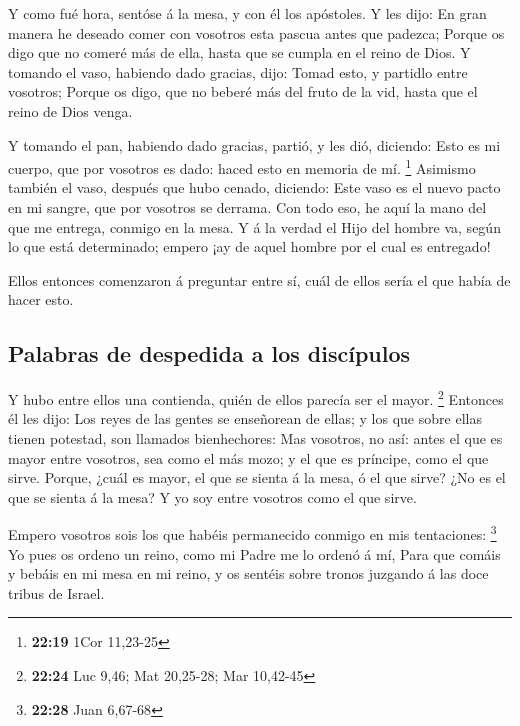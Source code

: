  Y como fué hora, sentóse á la mesa, y con él los
apóstoles.  Y les dijo: En gran manera he deseado comer
con vosotros esta pascua antes que padezca;  Porque os
digo que no comeré más de ella, hasta que se cumpla en el reino de Dios.
 Y tomando el vaso, habiendo dado gracias, dijo: Tomad
esto, y partidlo entre vosotros;  Porque os digo, que no
beberé más del fruto de la vid, hasta que el reino de Dios venga.

 Y tomando el pan, habiendo dado gracias, partió, y les
dió, diciendo: Esto es mi cuerpo, que por vosotros es dado: haced esto
en memoria de mí. \footnote{\textbf{22:19} 1Cor 11,23-25}
 Asimismo también el vaso, después que hubo cenado,
diciendo: Este vaso es el nuevo pacto en mi sangre, que por vosotros se
derrama.  Con todo eso, he aquí la mano del que me
entrega, conmigo en la mesa.  Y á la verdad el Hijo del
hombre va, según lo que está determinado; empero ¡ay de aquel hombre por
el cual es entregado!

 Ellos entonces comenzaron á preguntar entre sí, cuál de
ellos sería el que había de hacer esto.

\hypertarget{palabras-de-despedida-a-los-discuxedpulos}{%
\subsection{Palabras de despedida a los
discípulos}\label{palabras-de-despedida-a-los-discuxedpulos}}

 Y hubo entre ellos una contienda, quién de ellos parecía
ser el mayor. \footnote{\textbf{22:24} Luc 9,46; Mat 20,25-28; Mar
  10,42-45}  Entonces él les dijo: Los reyes de las
gentes se enseñorean de ellas; y los que sobre ellas tienen potestad,
son llamados bienhechores:  Mas vosotros, no así: antes
el que es mayor entre vosotros, sea como el más mozo; y el que es
príncipe, como el que sirve.  Porque, ¿cuál es mayor, el
que se sienta á la mesa, ó el que sirve? ¿No es el que se sienta á la
mesa? Y yo soy entre vosotros como el que sirve.

 Empero vosotros sois los que habéis permanecido conmigo
en mis tentaciones: \footnote{\textbf{22:28} Juan 6,67-68}
 Yo pues os ordeno un reino, como mi Padre me lo ordenó á
mí,  Para que comáis y bebáis en mi mesa en mi reino, y
os sentéis sobre tronos juzgando á las doce tribus de Israel.

